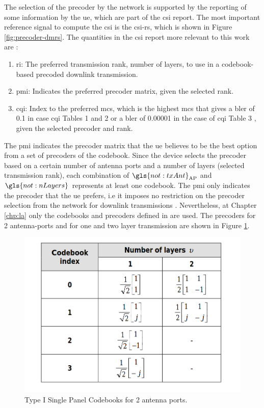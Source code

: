 The selection of the precoder by the network is supported by the reporting of some information by the \gls{ue}, which are part of the \gls{csi} report.
%
The most important reference signal to compute the \gls{csi} is the \gls{csi}-\gls{rs}, which is shown in Figure \ref{fig:precoder-dmrs}.
%
The quantities in the \gls{csi} report more relevant to this work are \cite{AliZaidi632018}:
%
\begin{enumerate}
    \item \Gls{ri}: The preferred transmission rank, number of layers, to use in a codebook-based precoded downlink transmission.
    \item \Gls{pmi}: Indicates the preferred precoder matrix, given the selected rank.
    \item \Gls{cqi}: Index to the preferred \gls{mcs}, which is the highest \gls{mcs} that gives a \gls{bler} of 0.1 in case \gls{cqi} Tables 1 and 2 \cite[Tables 5.2.2.1-2 \& 5.2.2.1-3]{3gpp.38.214} or a \gls{bler} of 0.00001 in the case of \gls{cqi} Table 3 \cite[5.2.2.1-4]{3gpp.38.214}, given the selected precoder and rank.
\end{enumerate}

The \gls{pmi} indicates the precoder matrix that the \gls{ue} believes to be the best option from a set of precoders of the codebook.
%
Since the device selects the precoder based on a certain number of antenna ports and a number of layers (selected transmission rank), each combination of $\gls{not:txAnt}_{\text{AP}}$ and $\gls{not:nLayers}$ represents at least one codebook.
%
The \gls{pmi} only indicates the precoder that the \gls{ue} prefers, i.e it imposes no restriction on the precoder selection from the network for downlink transmissions \cite{ErikDahlman5G, AliZaidi632018}.
%
Nevertheless, at Chapter \ref{chp:la} only the codebooks and precoders defined in \cite{3gpp.38.214} are used.
%
The precoders for 2 antenna-ports and for one and two layer transmission are shown in Figure \ref{fig:precoder-codebook}.

\begin{figure}[htb]
    \includegraphics[width=0.7\columnwidth]{figures/chp_theory/Precoders_codebook.png}
    \caption{Type I Single Panel Codebooks for 2 antenna ports. }
    \label{fig:precoder-codebook}
\end{figure}


